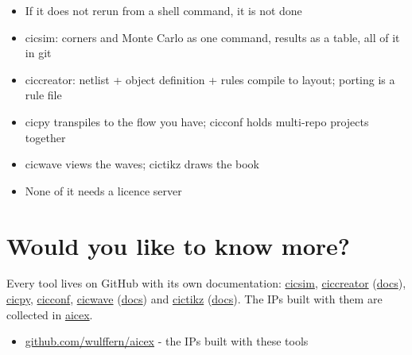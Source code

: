 \begin{itemize}
\tightlist
\item
  If it does not rerun from a shell command, it is not done
\item
  cicsim: corners and Monte Carlo as one command, results as a table,
  all of it in git
\item
  ciccreator: netlist + object definition + rules compile to layout;
  porting is a rule file
\item
  cicpy transpiles to the flow you have; cicconf holds multi-repo
  projects together
\item
  cicwave views the waves; cictikz draws the book
\item
  None of it needs a licence server
\end{itemize}

\section{Would you like to know
more?}\label{would-you-like-to-know-more}

Every tool lives on GitHub with its own documentation:
\href{https://github.com/wulffern/cicsim}{cicsim},
\href{https://github.com/wulffern/ciccreator}{ciccreator}
(\href{https://ciccreator.readthedocs.io/en/latest/index.html}{docs}),
\href{https://github.com/wulffern/cicpy}{cicpy},
\href{https://github.com/wulffern/cicconf}{cicconf},
\href{https://github.com/wulffern/cicwave}{cicwave}
(\href{https://wulffern.github.io/cicwave/}{docs}) and
\href{https://github.com/wulffern/cictikz}{cictikz}
(\href{https://analogicus.com/cictikz/}{docs}). The IPs built with them
are collected in \href{https://github.com/wulffern/aicex}{aicex}.

\begin{itemize}
\tightlist
\item
  \href{https://github.com/wulffern/aicex}{github.com/wulffern/aicex} -
  the IPs built with these tools
\end{itemize}
